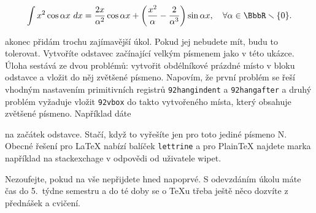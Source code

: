 $$ 
 \int x^2  \cos  \alpha x \ dx = {2x \over {\alpha}^2} \cos \alpha x + \left({{{x^2}\over{\alpha}}-{{2}\over {\alpha^3}}}\right) \sin \alpha x, \quad \forall \alpha \in \BbbR \smallsetminus \{0\}.
$$

\noindent
\hangindent=1.2cm akonec přidám trochu zajímavější úkol. Pokud jej nebudete mít, budu to tolerovat. Vytvoříte odstavec začínající velkým písmenem jako v této ukázce. Úloha sestává ze dvou problémů: vytvořit obdélníkové prázdné místo v bloku odstavce a vložit do něj zvětšené písmeno. Napovím, že první problém se řeší vhodným nastavením primitivních registrů {\tt \char92hangindent} a {\tt \char92hangafter} a druhý problém vyžaduje vložit {\tt \char92vbox} do takto vytvořeného místa, který obsahuje zvětšené písmeno. Například dáte
\begtt
\endtt


\noindent na začátek odstavce. Stačí, když to vyřešíte jen pro toto jediné písmeno N. Obecné řešení pro {\LaTeX} nabízí balíček {\tt lettrine} a pro {Plain\TeX} najdete marka například na stackexchage v odpovědi od uživatele wipet.

Nezoufejte, pokud na vše nepřijdete hned napoprvé. S odevzdáním úkolu máte čas do 5.~týdne semestru a do té doby se o {\TeX}u třeba ještě něco dozvíte z přednášek a cvičení.

\bye